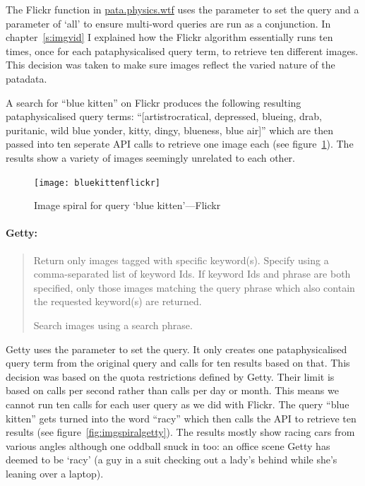 The Flickr function in \url{pata.physics.wtf} uses the  parameter to set the query and a  parameter of `all' to ensure multi-word queries are run as a conjunction. In chapter~\ref{s:imgvid} I explained how the Flickr algorithm essentially runs ten times, once for each pataphysicalised query term, to retrieve ten different images. This decision was taken to make sure images reflect the varied nature of the patadata.

A search for ``blue kitten'' on Flickr produces the following resulting pataphysicalised query terms: ``[artistrocratical, depressed, blueing, drab, puritanic, wild blue yonder, kitty, dingy, blueness, blue air]'' which are then passed into ten seperate \ac{API} calls to retrieve one image each (see figure~\ref{fig:imgspiralflickr}). The results show a variety of images seemingly unrelated to each other. 

\begin{figure}[!htbp]
\centering
  \texttt{[image: bluekittenflickr]}
\caption[Image spiral `blue kitten'---Flickr]{Image spiral for query `blue kitten'---Flickr}
\label{fig:imgspiralflickr}
\end{figure}

\paragraph{Getty:}
\begin{quotation}
  \begin{description}
  \vspace{-1cm}
    \item[keyword\_ids] Return only images tagged with specific keyword(s). Specify using a comma-separated list of keyword Ids. If keyword Ids and phrase are both specified, only those images matching the query phrase which also contain the requested keyword(s) are returned.
    \item[phrase] Search images using a search phrase.
  \end{description}
\end{quotation}

Getty uses the  parameter to set the query. It only creates one pataphysicalised query term from the original query and calls for ten results based on that. This decision was based on the quota restrictions defined by Getty. Their limit is based on calls per second rather than calls per day or month. This means we cannot run ten calls for each user query as we did with Flickr. The query ``blue kitten'' gets turned into the word ``racy'' which then calls the \ac{API} to retrieve ten results (see figure~\ref{fig:imgspiralgetty}). The results mostly show racing cars from various angles although one oddball snuck in too: an office scene Getty has deemed to be `racy' (a guy in a suit checking out a lady's behind while she's leaning over a laptop).

